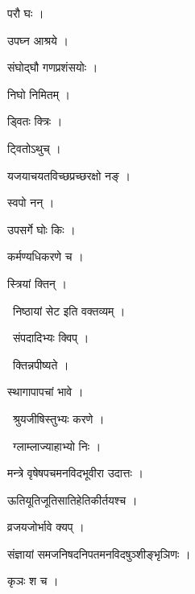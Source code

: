 \documentclass[10pt, openany, oneside]{book}
\begin{document}
\noindent परौ घः ।

\noindent उपघ्न आश्रये ।

\noindent संघोद्घौ गणप्रशंसयोः ।

\noindent निघो निमितम् ।

\noindent ड्वितः क्त्रिः ।

\noindent ट्वितोऽथुच् ।

\noindent यजयाचयतविच्छप्रच्छरक्षो नङ् ।

\noindent स्वपो नन् ।

\noindent उपसर्गे घोः किः ।

\noindent कर्मण्यधिकरणे च ।

\noindent स्त्रियां क्तिन् ।

\par\noindent\hspace{1.5em}{\vps वा॰}~{\qt निष्ठायां सेट इति वक्तव्यम् ।}

\par\noindent\hspace{1.5em}{\vps वा॰}~{\qt संपदादिभ्यः क्विप् ।}

\par\noindent\hspace{1.5em}{\vps वा॰}~{\qt क्तिन्नपीष्यते ।}

\noindent स्थागापापचां भावे ।

\par\noindent\hspace{1.5em}{\vps वा॰}~{\qt श्रुयजीषिस्तुभ्यः करणे ।}

\par\noindent\hspace{1.5em}{\vps वा॰}~{\qt ग्लाम्लाज्याहाभ्यो निः ।}

\noindent मन्त्रे वृषेषपचमनविदभूवीरा उदात्तः ।

\noindent ऊतियूतिजूतिसातिहेतिकीर्तयश्च ।

\noindent व्रजयजोर्भावे क्यप् ।

\noindent संज्ञायां समजनिषदनिपतमनविदषुञ्शीङ्भृञिणः ।

\noindent कृञः श च ।
\end{document}
